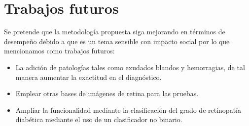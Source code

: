 \section{Trabajos futuros}
Se pretende que la metodología propuesta siga mejorando en términos de desempeño debido a que es un tema sensible con impacto social por lo que mencionamos como trabajos futuros:
\begin{itemize}
\item La adición de patologías tales como exudados blandos y hemorragias, de tal manera aumentar la exactitud en el diagnóstico.
\item Emplear  otras bases de imágenes de retina para las pruebas. 
\item Ampliar la funcionalidad mediante la clasificación del grado de retinopatía diabética mediante el uso de un clasificador no binario. 

\end{itemize}
